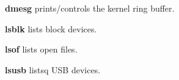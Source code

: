 \begin{enumx}
\item [\cmd] \textbf{dmesg} prints/controls the kernel ring buffer.
\item [\cmd] \textbf{lsblk} lists block devices.
\item [\cmd] \textbf{lsof} lists open files.
\item [\cmd] \textbf{lsusb} listsq USB devices.
\end{enumx}
